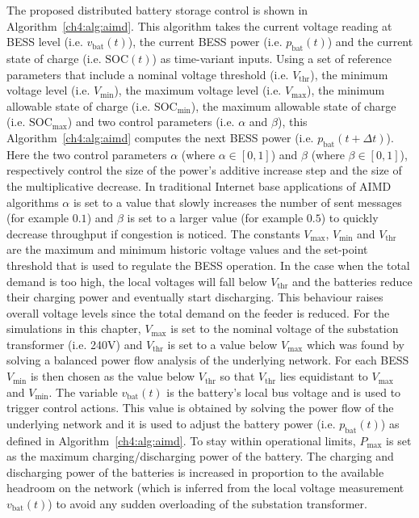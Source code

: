 The proposed distributed battery storage control is shown in Algorithm~\ref{ch4:alg:aimd}.
This algorithm takes the current voltage reading at BESS level (i.e. $v_\text{bat}(t)$), the current BESS power (i.e. $p_\text{bat}(t)$) and the current state of charge (i.e. $\text{SOC}(t)$) as time-variant inputs.
Using a set of reference parameters that include a nominal voltage threshold (i.e. $V_\text{thr}$), the minimum voltage level (i.e. $V_\text{min}$), the maximum voltage level (i.e. $V_\text{max}$), the minimum allowable state of charge (i.e. $\text{SOC}_\text{min}$), the maximum allowable state of charge (i.e. $\text{SOC}_\text{max}$) and two control parameters (i.e. $\alpha$ and $\beta$), this Algorithm~\ref{ch4:alg:aimd} computes the next BESS power (i.e. $p_\text{bat}(t + \Delta t)$).
Here the two control parameters $\alpha$ (where $\alpha \in [0, 1]$) and $\beta$ (where $\beta \in [0, 1]$), respectively control the size of the power's additive increase step and the size of the multiplicative decrease.
In traditional Internet base applications of AIMD algorithms $\alpha$ is set to a value that slowly increases the number of sent messages (for example $0.1$) and $\beta$ is set to a larger value (for example $0.5$) to quickly decrease throughput if congestion is noticed.
The constants $V_\text{max}$, $V_\text{min}$ and $V_\text{thr}$ are the maximum and minimum historic voltage values and the set-point threshold that is used to regulate the BESS operation.
In the case when the total demand is too high, the local voltages will fall below $V_\text{thr}$ and the batteries reduce their charging power and eventually start discharging.
This behaviour raises overall voltage levels since the total demand on the feeder is reduced.
For the simulations in this chapter, $V_\text{max}$ is set to the nominal voltage of the substation transformer (i.e. 240V) and $V_\text{thr}$ is set to a value below $V_\text{max}$ which was found by solving a balanced power flow analysis of the underlying network.
For each BESS $V_\text{min}$ is then chosen as the value below $V_\text{thr}$ so that $V_\text{thr}$ lies equidistant to $V_\text{max}$ and $V_\text{min}$.
The variable $v_\text{bat}(t)$ is the battery's local bus voltage and is used to trigger control actions.
This value is obtained by solving the power flow of the underlying network and it is used to adjust the battery power (i.e. $p_\text{bat}(t)$) as defined in Algorithm~\ref{ch4:alg:aimd}.
To stay within operational limits, $P_\text{max}$ is set as the maximum charging/discharging power of the battery.
The charging and discharging power of the batteries is increased in proportion to the available headroom on the network (which is inferred from the local voltage measurement $v_\text{bat}(t)$) to avoid any sudden overloading of the substation transformer.

